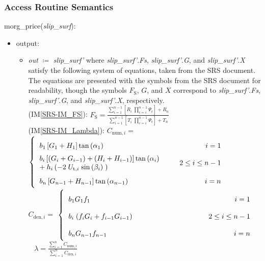 \documentclass[12pt, titlepage]{article}
\newcommand{\iref}[1]{IM\ref{#1}}
\begin{document}
\subsubsection{Access Routine Semantics}
morg\_price(\textit{slip\_surf}):
\begin{itemize}
	\item output:
	\begin{itemize}
		\item[] \textit{out} $\coloneqq$ \textit{slip\_surf'} where 
		\textit{slip\_surf'}.\textit{Fs}, \textit{slip\_surf'}.\textit{G}, and 
		\textit{slip\_surf'}.\textit{X} satisfy the following system of 
		equations, taken from the SRS document. The equations are presented 
		with the symbols from the SRS document for readability, though the 
		symbols $F_\text{S}$, $G$, and $X$ correspond to 
		\textit{slip\_surf'}.\textit{Fs}, \textit{slip\_surf'}.\textit{G}, and 
		\textit{slip\_surf'}.\textit{X}, respectively.\\
		
		(\iref{SRS-IM_FS}): \( {F_\text{S}}= 
		\frac{\displaystyle\sum_{i=1}^{n-1} \left[ 
		{R_{i}}
			\;{\displaystyle\prod_{c=i}^{n-1} \Psi_{c}
			}\right] + {R_{n}} }{\displaystyle\sum_{i=1}^{n-1} \left[ {T_{i}}
			\;{\displaystyle\prod_{c=i}^{n-1} \Psi_{c}
			}\right] + {T_{n}} } \)\\
		
		(\iref{SRS-IM_Lambda}): \( {C_{\text{num},i}}= \) 
		\(  \left\{
		\renewcommand{\arraystretch}{2}
		\begin{tabular}{ p{6.5cm} r} 
		$ {{b}_{\text{1}}}\left[{{G}_{\text{1}} + {H}_{\text{1}}}
		\right]{\tan\left(\alpha_{\text{1}}\right) } $ &  $
		i={\text{1}} $ \\
		\noindent\parbox[c]{\hsize} {$ {{b}_{i}} \left[
			\left({{G}_{i} + {G}_{i-1}}\right) +
			\left({{H}_{i} + {H}_{i-1}}\right)
			\right]{\tan\left(\alpha_{i}\right)} \\ +
			{{h}_{i}}\left( 
			-{2}\;{U_{\text{t},i}}\;{\sin\left(\beta_{i}\right)}
			\;\right) $}
		&  $ 2\leq i \leq{n-1} $ \\ $
		{{b}_{n}}\left[{{G}_{n-1} +
			{H}_{n-1}}\right]{\tan\left(\alpha_{n-1}\right)
		} $ &  $ i=n $ \\
		\end{tabular} 
		\renewcommand{\arraystretch}{1}
		\right. \)
		~\newline~\newline
		\( {C_{\text{den},i}}= \)
		\(  \left\{
		\renewcommand{\arraystretch}{2}
		\begin{tabular}{ p{6.5cm} r} 
		$ {{b}_{\text{1}}}{{G}_{\text{1}}}{f_{\text{1}}} $ &  $
		i=\text{1} $ \\ $ {{b}_{i}}\;{\left({
				{f_{i}}{{G}_{i}} +
				{f_{i-1}}{{G}_{i-1}} }\right)} $ &  $
		2\leq i \leq{n-1} $ \\ $
		{{b}_{n}}{{G}_{n-1}}{f_{n-1}} $ &  $
		i=n $ \\
		\end{tabular} 
		\renewcommand{\arraystretch}{1}
		\right. \) 
		~\newline
		\( \lambda= \frac{ \displaystyle\sum_{i=1}^{n} {C_{\text{num},i}}}
		{\displaystyle\sum_{i=1}^{n} {C_{\text{den},i}}} \) \\
		

\end{itemize}
\end{itemize}
\end{document}
